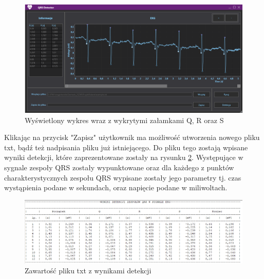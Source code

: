 \documentclass[11pt]{report}
\begin{document}
	\begin{figure} [H]
		\centering
		\includegraphics[width=1\linewidth]{wykres.png}
		\caption{Wyświetlony wykres wraz z wykrytymi załamkami Q, R oraz S}
		\label{fig:wykresy}
	\end{figure}
	\vspace{2cm}
	
	Klikając na przycisk "Zapisz" użytkownik ma możliwość utworzenia nowego pliku txt, bądź też nadpisania pliku już istniejącego. Do pliku tego zostają wpisane wyniki detekcji, które zaprezentowane zostały na rysunku \ref{fig:wynik}. Występujące w sygnale zespoły QRS zostały wypunktowane oraz dla każdego z punktów charakterystycznych zespołu QRS wypisane zostały jego parametry tj. czas wystąpienia podane w sekundach, oraz napięcie podane w miliwoltach.
	
	\begin{figure} [H]
		\centering
		\includegraphics[width=1\linewidth]{wynik.png}
		\caption{Zawartość pliku txt z wynikami detekcji}
		\label{fig:wynik}
	\end{figure}
	\vspace{2cm}
	
	
\end{document}
